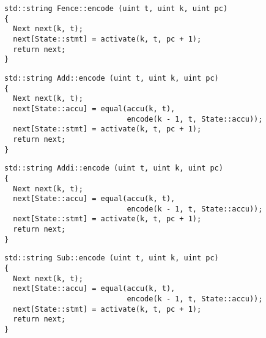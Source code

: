 
\begin{lstlisting}[style=c++, style=encode]
std::string Fence::encode (uint t, uint k, uint pc)
{
  Next next(k, t);
  next[State::stmt] = activate(k, t, pc + 1);
  return next;
}
\end{lstlisting}


\begin{lstlisting}[style=c++, style=encode]
std::string Add::encode (uint t, uint k, uint pc)
{
  Next next(k, t);
  next[State::accu] = equal(accu(k, t),
                            encode(k - 1, t, State::accu));
  next[State::stmt] = activate(k, t, pc + 1);
  return next;
}
\end{lstlisting}


\newpage

\begin{lstlisting}[style=c++, style=encode]
std::string Addi::encode (uint t, uint k, uint pc)
{
  Next next(k, t);
  next[State::accu] = equal(accu(k, t),
                            encode(k - 1, t, State::accu));
  next[State::stmt] = activate(k, t, pc + 1);
  return next;
}
\end{lstlisting}


\begin{lstlisting}[style=c++, style=encode]
std::string Sub::encode (uint t, uint k, uint pc)
{
  Next next(k, t);
  next[State::accu] = equal(accu(k, t),
                            encode(k - 1, t, State::accu));
  next[State::stmt] = activate(k, t, pc + 1);
  return next;
}
\end{lstlisting}


